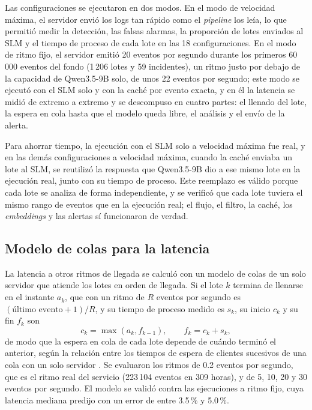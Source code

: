 Las configuraciones se ejecutaron en dos modos. En el modo de velocidad máxima, el servidor envió los logs tan rápido como el \textit{pipeline} los leía, lo que permitió medir la detección, las falsas alarmas, la proporción de lotes enviados al SLM y el tiempo de proceso de cada lote en las 18 configuraciones. En el modo de ritmo fijo, el servidor emitió 20 eventos por segundo durante los primeros 60\,000 eventos del fondo (1\,206 lotes y 59 incidentes), un ritmo justo por debajo de la capacidad de Qwen3.5-9B solo, de unos 22 eventos por segundo; este modo se ejecutó con el SLM solo y con la caché por evento exacta, y en él la latencia se midió de extremo a extremo y se descompuso en cuatro partes: el llenado del lote, la espera en cola hasta que el modelo queda libre, el análisis y el envío de la alerta.

Para ahorrar tiempo, la ejecución con el SLM solo a velocidad máxima fue real, y en las demás configuraciones a velocidad máxima, cuando la caché enviaba un lote al SLM, se reutilizó la respuesta que Qwen3.5-9B dio a ese mismo lote en la ejecución real, junto con su tiempo de proceso. Este reemplazo es válido porque cada lote se analiza de forma independiente, y se verificó que cada lote tuviera el mismo rango de eventos que en la ejecución real; el flujo, el filtro, la caché, los \textit{embeddings} y las alertas sí funcionaron de verdad.

\subsection{Modelo de colas para la latencia}

La latencia a otros ritmos de llegada se calculó con un modelo de colas de un solo servidor que atiende los lotes en orden de llegada. Si el lote $k$ termina de llenarse en el instante $a_k$, que con un ritmo de $R$ eventos por segundo es $(\text{último evento} + 1)/R$, y su tiempo de proceso medido es $s_k$, su inicio $c_k$ y su fin $f_k$ son
\begin{equation}
c_k = \max(a_k, f_{k-1}), \qquad f_k = c_k + s_k,
\end{equation}
de modo que la espera en cola de cada lote depende de cuándo terminó el anterior, según la relación entre los tiempos de espera de clientes sucesivos de una cola con un solo servidor \cite{lindley1952_queues}. Se evaluaron los ritmos de 0.2 eventos por segundo, que es el ritmo real del servicio (223\,104 eventos en 309 horas), y de 5, 10, 20 y 30 eventos por segundo. El modelo se validó contra las ejecuciones a ritmo fijo, cuya latencia mediana predijo con un error de entre 3.5\,\% y 5.0\,\%.


